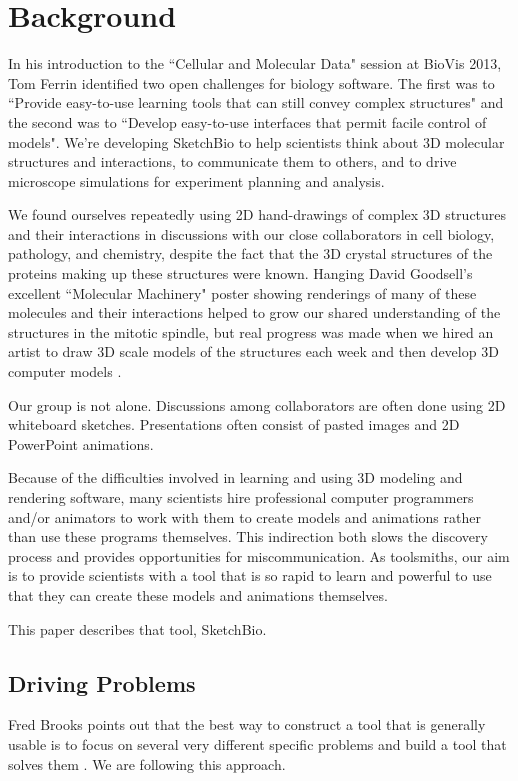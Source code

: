 \documentclass[twocolumn]{bmcart}%
\begin{document}


\section*{Background}

In his introduction to the ``Cellular and Molecular Data" session at BioVis 2013, Tom Ferrin identified two open challenges for biology software.  The first was to ``Provide easy-to-use learning tools that can still convey complex structures" and the second was to ``Develop easy-to-use interfaces that permit facile control of models".  We’re developing SketchBio to help scientists think about 3D molecular structures and interactions, to communicate them to others, and to drive microscope simulations for experiment planning and analysis.

We found ourselves repeatedly using 2D hand-drawings of complex 3D structures and their interactions in discussions with our close collaborators in cell biology, pathology, and chemistry, despite the fact that the 3D crystal structures of the proteins making up these structures were known.  Hanging David Goodsell's excellent ``Molecular Machinery" poster \cite{Goodsell} showing renderings of many of these molecules and their interactions helped to grow our shared understanding of the structures in the mitotic spindle, but real progress was made when we hired an artist to draw 3D scale models of the structures each week and then develop 3D computer models \cite{taylor2012}.

Our group is not alone.  Discussions among collaborators are often done using 2D whiteboard sketches.  Presentations often consist of pasted images and 2D PowerPoint animations.

Because of the difficulties involved in learning and using 3D modeling and rendering software, many scientists hire professional computer programmers and/or animators to work with them to create models and animations rather than use these programs themselves.  This indirection both slows the discovery process and provides opportunities for miscommunication. As toolsmiths, our aim is to provide scientists with a tool that is so rapid to learn and powerful to use that they can create these models and animations themselves.

This paper describes that tool, SketchBio.

\subsection*{Driving Problems}
Fred Brooks points out that the best way to construct a tool that is generally usable is to focus on several very different specific problems and build a tool that solves them \cite{Brooks}.  We are following this approach.
\end{document}

